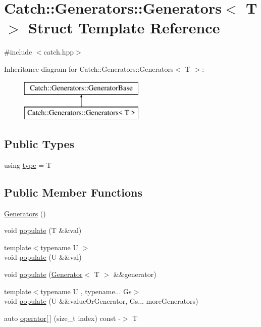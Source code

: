 \hypertarget{struct_catch_1_1_generators_1_1_generators}{}\section{Catch\+:\+:Generators\+:\+:Generators$<$ T $>$ Struct Template Reference}
\label{struct_catch_1_1_generators_1_1_generators}


{\ttfamily \#include $<$catch.\+hpp$>$}

Inheritance diagram for Catch\+:\+:Generators\+:\+:Generators$<$ T $>$\+:\begin{figure}[H]
\begin{center}
\leavevmode
\includegraphics[height=2.000000cm]{struct_catch_1_1_generators_1_1_generators}
\end{center}
\end{figure}
\subsection*{Public Types}
\begin{DoxyCompactItemize}
\item 
using \mbox{\hyperlink{struct_catch_1_1_generators_1_1_generators_aab27f98a577b49532b2ca7556a84286b}{type}} = T
\end{DoxyCompactItemize}
\subsection*{Public Member Functions}
\begin{DoxyCompactItemize}
\item 
\mbox{\hyperlink{struct_catch_1_1_generators_1_1_generators_ad936c563841f7db16a301576c40622e4}{Generators}} ()
\item 
void \mbox{\hyperlink{struct_catch_1_1_generators_1_1_generators_ad708036fa5a9bf0cd1520ce111bc851d}{populate}} (T \&\&val)
\item 
{\footnotesize template$<$typename U $>$ }\\void \mbox{\hyperlink{struct_catch_1_1_generators_1_1_generators_a8ff8b7dda734d1808b644fefc67f4c98}{populate}} (U \&\&val)
\item 
void \mbox{\hyperlink{struct_catch_1_1_generators_1_1_generators_a2155cad48ab03c362483e200d957eefc}{populate}} (\mbox{\hyperlink{class_catch_1_1_generators_1_1_generator}{Generator}}$<$ T $>$ \&\&generator)
\item 
{\footnotesize template$<$typename U , typename... Gs$>$ }\\void \mbox{\hyperlink{struct_catch_1_1_generators_1_1_generators_a4b9680ee28e48e4dc4c4538b5510e649}{populate}} (U \&\&value\+Or\+Generator, Gs... more\+Generators)
\item 
auto \mbox{\hyperlink{struct_catch_1_1_generators_1_1_generators_a1812ebb7d0146d63e3a005e93831afa2}{operator\mbox{[}$\,$\mbox{]}}} (size\+\_\+t index) const -\/$>$ T
\end{DoxyCompactItemize}
